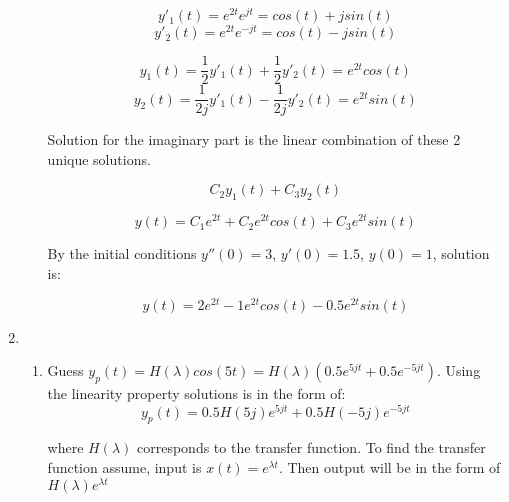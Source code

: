 \documentclass[10pt,a4paper, margin=1in]{article}
\begin{document}
\begin{enumerate}
\begin{enumerate}
        \begin{equation*}
            y'_1(t) = e^{2t}e^{jt} = cos(t) + jsin(t)
        \end{equation*}
        \begin{equation*}
            y'_2(t) = e^{2t}e^{-jt} = cos(t) - jsin(t)
        \end{equation*}

        \begin{equation*}
            y_1(t) = \frac{1}{2} y'_1(t)+\frac{1}{2}y'_2(t) = e^{2t}cos(t)
        \end{equation*}
        \begin{equation*}
            y_2(t)= \frac{1}{2j} y'_1(t)-\frac{1}{2j}y'_2(t) = e^{2t}sin(t)
        \end{equation*}

        Solution for the imaginary part is the linear combination of these 2 unique solutions.

        \begin{equation*}
            C_2y_1(t)+C_3y_2(t)
        \end{equation*}

        \begin{equation*}
            y(t) = C_1e^{2t} + C_2e^{2t}cos(t) + C_3e^{2t}sin(t)
        \end{equation*}

        By the initial conditions $y''(0) = 3$, $y'(0) = 1.5$, $y(0) = 1$, solution is:

        \begin{equation*}
            y(t) = 2e^{2t} - 1e^{2t}cos(t) - 0.5e^{2t}sin(t)
        \end{equation*}

    \end{enumerate}

\item %
    \begin{enumerate}
    \item %
        Guess $y_p(t) = H(\lambda)cos(5t) = H(\lambda)(0.5e^{5jt} +0.5e^{-5jt})$. Using the linearity property solutions is in the form of:
        \begin{equation*}
            y_p(t) = 0.5 H(5j)e^{5jt} + 0.5 H(-5j)e^{-5jt}
        \end{equation*}

        where $H(\lambda)$ corresponds to the transfer function. To find the transfer function assume, input is $x(t) = e^{\lambda t}$. 
        Then output will be in the form of $H(\lambda)e^{\lambda t}$


\end{enumerate}
\end{enumerate}
\end{document}
